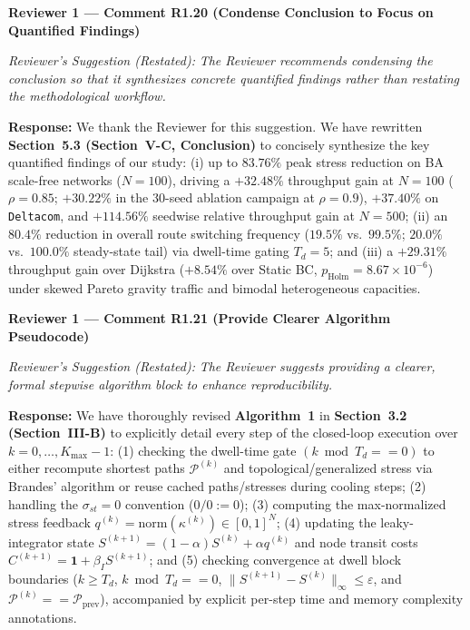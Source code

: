\documentclass[11pt,a4paper]{article}
\newcommand{\cbox}[2]{%
  \vspace{0.6em}\noindent\textbf{#1}\par\smallskip
  \noindent\textit{Reviewer's Suggestion (Restated):} \textit{#2}\par\smallskip
}
\begin{document}
\hrulefill

\cbox{Reviewer 1 --- Comment R1.20 (Condense Conclusion to Focus on Quantified Findings)}{The Reviewer recommends condensing the conclusion so that it synthesizes concrete quantified findings rather than restating the methodological workflow.}

\noindent\textbf{Response:} We thank the Reviewer for this suggestion. We have rewritten \textbf{Section~5.3 (Section~V-C, Conclusion)} to concisely synthesize the key quantified findings of our study: (i) up to $83.76\%$ peak stress reduction on BA scale-free networks ($N=100$), driving a $+32.48\%$ throughput gain at $N=100$ ($\rho=0.85$; $+30.22\%$ in the 30-seed ablation campaign at $\rho=0.9$), $+37.40\%$ on \texttt{Deltacom}, and $+114.56\%$ seedwise relative throughput gain at $N=500$; (ii) an $80.4\%$ reduction in overall route switching frequency ($19.5\%$ vs.\ $99.5\%$; $20.0\%$ vs.\ $100.0\%$ steady-state tail) via dwell-time gating $T_d=5$; and (iii) a $+29.31\%$ throughput gain over Dijkstra ($+8.54\%$ over Static BC, $p_{\text{Holm}}=8.67 \times 10^{-6}$) under skewed Pareto gravity traffic and bimodal heterogeneous capacities.

\hrulefill

\cbox{Reviewer 1 --- Comment R1.21 (Provide Clearer Algorithm Pseudocode)}{The Reviewer suggests providing a clearer, formal stepwise algorithm block to enhance reproducibility.}

\noindent\textbf{Response:} We have thoroughly revised \textbf{Algorithm~1} in \textbf{Section~3.2 (Section~III-B)} to explicitly detail every step of the closed-loop execution over $k = 0, \dots, K_{\max}-1$: (1) checking the dwell-time gate $(k \bmod T_d == 0)$ to either recompute shortest paths $\mathcal{P}^{(k)}$ and topological/generalized stress via Brandes' algorithm or reuse cached paths/stresses during cooling steps; (2) handling the $\sigma_{st}=0$ convention ($0/0 := 0$); (3) computing the max-normalized stress feedback $q^{(k)} = \mathrm{norm}(\kappa^{(k)}) \in [0,1]^N$; (4) updating the leaky-integrator state $S^{(k+1)} = (1-\alpha)S^{(k)} + \alpha q^{(k)}$ and node transit costs $C^{(k+1)} = \mathbf{1} + \beta_I S^{(k+1)}$; and (5) checking convergence at dwell block boundaries ($k \ge T_d$, $k \bmod T_d == 0$, $\|S^{(k+1)}-S^{(k)}\|_\infty \le \varepsilon$, and $\mathcal{P}^{(k)} == \mathcal{P}_{\text{prev}}$), accompanied by explicit per-step time and memory complexity annotations.

\hrulefill
\end{document}

